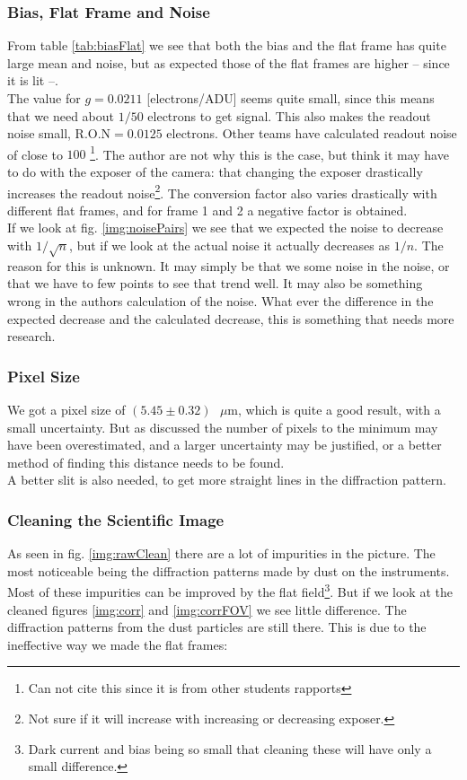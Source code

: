 \documentclass{emulateapj}
\begin{document}
\subsubsection{Bias, Flat Frame and Noise}
From table \ref{tab:biasFlat} we see that both the bias and the flat frame has quite large mean and noise, but as expected those of the flat frames are higher -- since it is lit --. \\

The value for $g = 0.0211$ [electrons/ADU] seems quite small, since this means that we need about $1/50$ electrons to get signal. This also makes the readout noise small, R.O.N$=0.0125$ electrons. Other teams have calculated readout noise of close to $100$ \footnote{Can not cite this since it is from other students rapports}. The author are not why this is the case, but think it may have to do with the exposer of the camera: that changing the exposer drastically increases the readout noise\footnote{Not sure if it will increase with increasing or decreasing exposer.}. The conversion factor also varies drastically with different flat frames, and for frame 1 and 2 a negative factor is obtained.\\

If we look at fig. \ref{img:noisePairs} we see that we expected the noise to decrease with $1/\sqrt{n}$, but if we look at the actual noise it actually  decreases as $1/n$. The reason for this is unknown. It may simply be that we some noise in the noise, or that we have to few points to see that trend well. It may also be something wrong in the authors calculation of the noise. What ever the difference in the expected decrease and the calculated decrease, this is something that needs more research.

\subsubsection{Pixel Size}
We got a pixel size of $(5.45 \pm 0.32) \text{ }\mu$m, which is quite a good result, with a small uncertainty. But as discussed the number of pixels to the minimum may have been overestimated, and a larger uncertainty may be justified, or a better method of finding this distance needs to be found.\\

A better slit is also needed, to get more straight lines in the diffraction pattern.

\subsubsection{Cleaning the Scientific Image}
\label{sec:disClean}
As seen in fig. \ref{img:rawClean} there are a lot of impurities in the picture. The most noticeable being the diffraction patterns made by dust on the instruments. Most of these impurities can be improved by the flat field\footnote{Dark current and bias being so small that cleaning these will have only a small difference.}. But if we look at the cleaned figures \ref{img:corr} and \ref{img:corrFOV} we see little difference. The diffraction patterns from the dust particles are still there. This is due to the ineffective way we made the flat frames:
\end{document}
